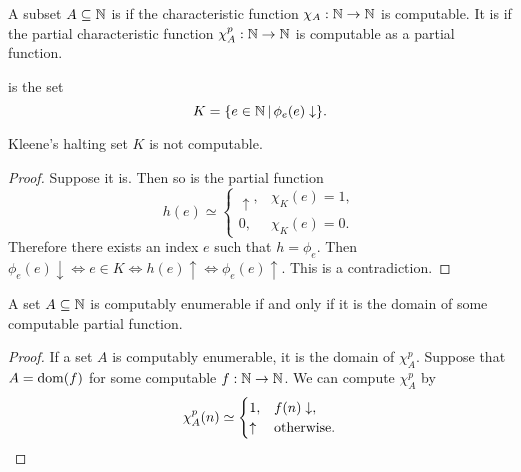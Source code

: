 
\begin{definition}
  A subset $A \subseteq \mathbb{N}$ is  if the characteristic function
  $\chi_A: \mathbb{N} \to \mathbb{N}$ is computable.
  It is  if the partial characteristic function
  $\chi_A^p: \mathbb{N} \to \mathbb{N}$ is computable as a partial function.
\end{definition}

\begin{definition}
   is the set
  \[
	K = \{e \in \mathbb{N} \,|\, \phi_e(e) \downarrow \}.
  \]
\end{definition}

\begin{proposition}
  Kleene's halting set $K$ is not computable.
\end{proposition}

\begin{proof}
  Suppose it is.
  Then so is the partial function
  \[
	h(e) \simeq
	\begin{cases}
	  \uparrow, & \chi_K(e) = 1, \\
	  0, & \chi_K(e) = 0.
	\end{cases}
  \]
  Therefore there exists an index $e$ such that $h = \phi_e$.
  Then $\phi_e(e) \downarrow \iff e \in K \iff h(e) \uparrow \iff \phi_e(e)
  \uparrow$.
  This is a contradiction.
\end{proof}


\begin{proposition}
  A set $A \subseteq \mathbb{N}$ is computably enumerable if and only if it is the
  domain of some computable partial function.
\end{proposition}

\begin{proof}
  If a set $A$ is computably enumerable, it is the domain of $\chi_A^p$.
  Suppose that $A = \operatorname{dom}(f)$ for some computable $f: \mathbb{N} \to \mathbb{N}$.
  We can compute $\chi_A^p$ by
  \[
	\chi_A^p(n) \simeq
	\begin{cases}
	  1, & f(n) \downarrow, \\
	  \uparrow & \text{otherwise.} \qedhere
	\end{cases}
  \]
\end{proof}


